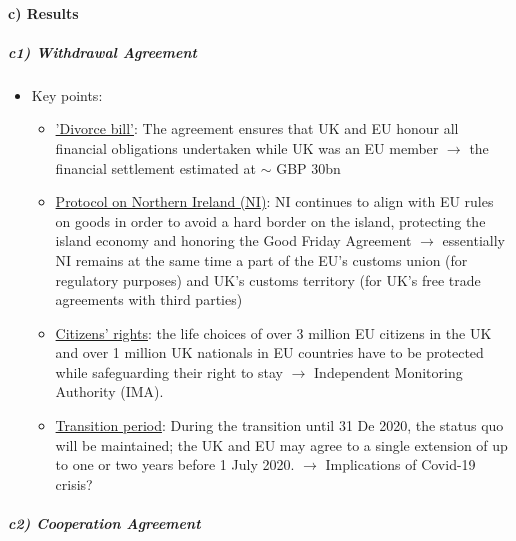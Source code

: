 \paragraph{c) Results}

\subparagraph{c1) Withdrawal Agreement}

\begin{itemize}
    \item Key points:
        \begin{itemize}
            \item \underline{'Divorce bill'}: The agreement ensures that UK and EU honour
                all financial obligations undertaken while UK was an EU member
                $\rightarrow$ the financial settlement estimated at $\sim$
                GBP 30bn
            \item \underline{Protocol on Northern Ireland (NI)}: NI continues to align
                with EU rules on goods in order to avoid a hard border on the
                island, protecting the island economy and honoring the Good
                Friday Agreement $\rightarrow$ essentially NI remains at the
                same time a part of the EU's customs union (for regulatory
                purposes) and UK's customs territory (for UK's free trade
                agreements with third parties)
            \item \underline{Citizens' rights}: the life choices of over 3 million
                EU citizens in the UK and over 1 million UK nationals in
                EU countries have to be protected while safeguarding their
                right to stay $\rightarrow$ Independent Monitoring
                Authority (IMA).
            \item \underline{Transition period}: During the transition until 31 De 2020,
                the status quo will be maintained; the UK and EU may agree
                to a single extension of up to one or two years before 1 July
                2020. $\rightarrow$ Implications of Covid-19 crisis?
        \end{itemize}
\end{itemize}

\subparagraph{c2) Cooperation Agreement}

